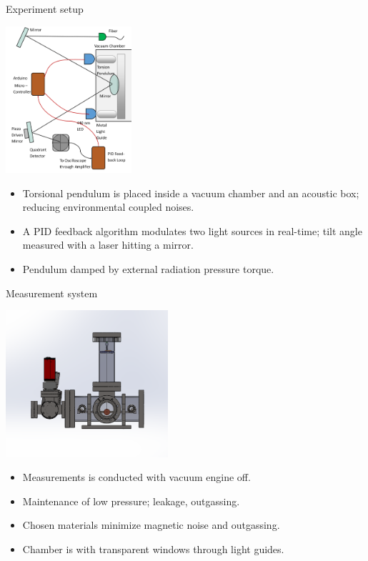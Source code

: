 \documentclass{beamer}
\begin{document}
\begin{frame}{Experiment setup}
	\begin{center}		
			\includegraphics[width=0.35\textwidth,keepaspectratio]{setup cropped.png}
	\end{center}
	\begin{itemize}
		\item Torsional pendulum is placed inside a vacuum chamber and an acoustic box; reducing environmental coupled noises.
		\item A PID feedback algorithm modulates two light sources in real-time; tilt angle measured with a laser hitting a mirror.
		\item Pendulum damped by external radiation pressure torque.
	
	\end{itemize}
	
\end{frame}

\begin{frame}{Measurement system}
	\begin{center}		
		\includegraphics[width=0.45\textwidth,keepaspectratio]{total_chamber.png}
	\end{center}
	\begin{itemize}
		\item Measurements is conducted with vacuum engine off.
		\item Maintenance of low pressure; leakage, outgassing.
		\item Chosen materials minimize magnetic noise and outgassing.
		\item Chamber is with transparent windows through light guides.


		
	\end{itemize}	
\end{frame}
\end{document}

